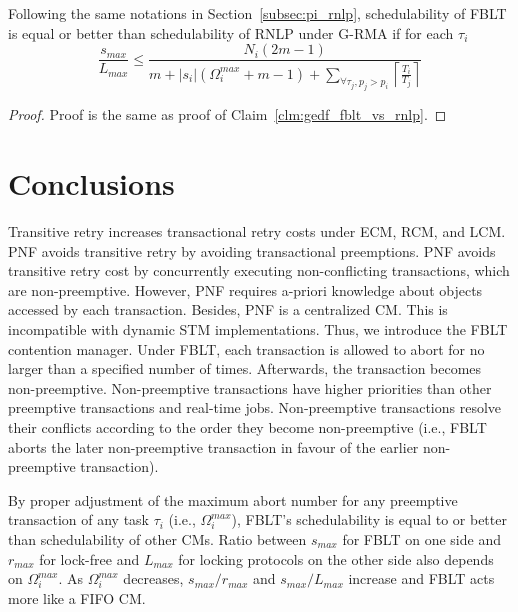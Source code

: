 %
\begin{clm}\label{clm:grma_fblt_vs_rnlp}
%
Following the same notations in Section~\ref{subsec:pi_rnlp}, schedulability of FBLT is equal or better than schedulability of RNLP under G-RMA if for each $\tau_i$
%
\begin{equation*}
\frac{s_{max}}{L_{max}}\le\frac{N_{i}\left(2m-1\right)}{m+|s_{i}|\left(\Omega_{i}^{max}+m-1\right)+\sum_{\forall\tau_{j},p_{j}>p_{i}}\left\lceil \frac{T_{i}}{T_{j}}\right\rceil }
\end{equation*}
%
\end{clm}
%
\begin{proof}
%
Proof is the same as proof of Claim~\ref{clm:gedf_fblt_vs_rnlp}.
%
\end{proof}
%
\section{Conclusions}\label{conclusion}
%
Transitive retry increases transactional retry costs under ECM, RCM, and LCM. PNF avoids transitive retry by avoiding transactional preemptions. PNF avoids transitive retry cost by concurrently executing non-conflicting transactions, which are non-preemptive. However, PNF requires a-priori knowledge about objects accessed by each transaction. Besides, PNF is a centralized CM. This is incompatible with dynamic STM implementations. Thus, we introduce the FBLT contention manager. Under FBLT, each transaction is allowed to abort for no larger than a specified number of times. Afterwards, the transaction becomes non-preemptive. Non-preemptive transactions have higher priorities than other preemptive transactions and real-time jobs. Non-preemptive transactions resolve their conflicts according to the order they become non-preemptive (i.e., FBLT aborts the later non-preemptive transaction in favour of the earlier non-preemptive transaction). 

By proper adjustment of the maximum abort number for any preemptive transaction of any task $\tau_i$ (i.e., $\Omega_i^{max}$), FBLT's schedulability is equal to or better than schedulability of other CMs. Ratio between $s_{max}$ for FBLT on one side and $r_{max}$ for lock-free and $L_{max}$ for locking protocols on the other side also depends on $\Omega_i^{max}$.  As $\Omega_i^{max}$ decreases, $s_{max}/r_{max}$ and $s_{max}/L_{max}$ increase and FBLT acts more like a FIFO CM.